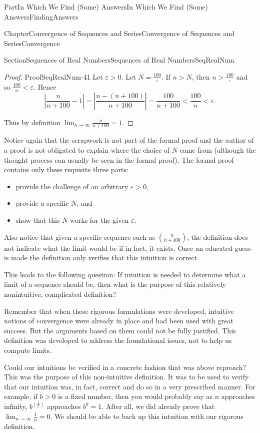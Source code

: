 \documentclass[oneside,10pt,]{book}
\numberwithin{equation}{part}
\def\limit#1#2#3{{\displaystyle\lim_{#1\rightarrow #2}#3}}
\def\limitt#1#2#3{{\displaystyle\lim_{#1\rightarrow #2}\textstyle #3}}
\newcommand{\eps}{\varepsilon}
\newcommand{\lt}{<}
\begin{document}
\begin{partptx}{Part}{In Which We Find (Some) Answers}{}{In Which We Find (Some) Answers}{}{}{FindingAnswers}
\begin{chapterptx}{Chapter}{Convergence of Sequences and Series}{}{Convergence of Sequences and Series}{}{}{Convergence}
\begin{sectionptx}{Section}{Sequences of Real Numbers}{}{Sequences of Real Numbers}{}{}{SeqRealNum}
\begin{proof}{Proof}{}{SeqRealNum-41}
Let \(\eps>0\). Let \(N=\frac{100}{\eps}\). If \(n>N\), then \(n>\frac{100}{\eps}\) and so \(\frac{100}{n}\lt \eps\). Hence%
\begin{equation*}
\left|\frac{n}{n+100}-1\right|=\left|\frac{n-(n+100)}{n+100}\right|= \frac{100}{n+100}\lt \frac{100}{n}\lt \eps\text{.}
\end{equation*}
%
\par
Thus by definition \(\limitt{n}{\infty}{\frac{n}{n+100}} =1\).%
\end{proof}
Notice again that the scrapwork is not part of the formal proof and the author of a proof is not obligated to explain where the choice of \(N\) came from (although the thought process can usually be seen in the formal proof).  The formal proof contains only these requisite three parts:%
\begin{itemize}[label=\textbullet]
\item{}provide the challenge of an arbitrary \(\eps>0\),%
\item{}provide a specific \(N\), and%
\item{}show that this \(N\) works for the given \(\eps\).%
\end{itemize}
%
\par
Also notice that given a specific sequence such as \(\left(\frac{n}{n+100}\right)\), the definition does not indicate what the limit would be if in fact, it exists.  Once an educated guess is made the definition only verifies that this intuition is correct.%
\par
This leads to the following question: If intuition is needed to determine what a limit of a sequence should be, then what is the purpose of this relatively non\textendash{}intuitive, complicated definition?%
\par
Remember that when these rigorous formulations were developed, intuitive notions of convergence were already in place and had been used with great success.  But the arguments based on them could not be fully justified. This definition was developed to address the foundational issues, not to help us compute limits.%
\par
Could our intuitions be verified in a concrete fashion that was above reproach? This was the purpose of this non-intuitive definition. It was to be used to verify that our intuition was, in fact, correct and do so in a very prescribed manner. For example, if \(b>0\) is a fixed number, then you would probably say as \(n\) approaches infinity, \(b^{\left(\frac{1}{n}\right)}\) approaches \(b^0=1\). After all, we did already prove that \(\limit{n}{\infty}{\frac{1}{n}}=0\). We should be able to back up this intuition with our rigorous definition.%

\end{sectionptx}
\end{chapterptx}
\end{partptx}
\end{document}
